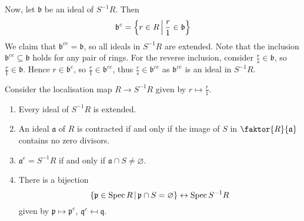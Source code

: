 Now, let \( \mathfrak b \) be an ideal of \( S^{-1}R \).
Then
\[ \mathfrak b^c = \qty{r \in R \,\middle|\,\frac{r}{1} \in \mathfrak b} \]
We claim that \( \mathfrak b^{ce} = \mathfrak b \), so all ideals in \( S^{-1}R \) are extended.
Note that the inclusion \( \mathfrak b^{ce} \subseteq \mathfrak b \) holds for any pair of rings.
For the reverse inclusion, consider \( \frac{r}{s} \in \mathfrak b \), so \( \frac{r}{1} \in \mathfrak b \).
Hence \( r \in \mathfrak b^c \), so \( \frac{r}{1} \in \mathfrak b^{ce} \), thus \( \frac{r}{s} \in \mathfrak b^{ce} \) as \( \mathfrak b^{ce} \) is an ideal in \( S^{-1}R \).
\begin{proposition}
    Consider the localisation map \( R \to S^{-1}R \) given by \( r \mapsto \frac{r}{1} \).
    \begin{enumerate}
        \item Every ideal of \( S^{-1}R \) is extended.
        \item An ideal \( \mathfrak a \) of \( R \) is contracted if and only if the image of \( S \) in \( \faktor{R}{\mathfrak a} \) contains no zero divisors.
        \item \( \mathfrak a^e = S^{-1}R \) if and only if \( \mathfrak a \cap S \neq \varnothing \).
        \item There is a bijection
        \[ \qty{\mathfrak p \in \operatorname{Spec}R \,\middle|\,\mathfrak p \cap S = \varnothing} \leftrightarrow \operatorname{Spec} S^{-1}R \]
        given by \( \mathfrak p \mapsto \mathfrak p^e \), \( \mathfrak q^c \mapsfrom \mathfrak q \).
    \end{enumerate}
\end{proposition}

